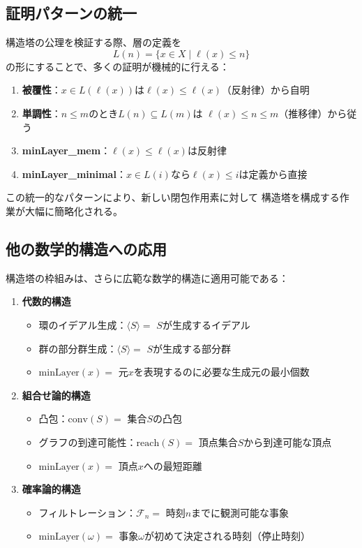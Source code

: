 \documentclass[a4paper,12pt]{ltjsarticle}
\theoremstyle{definition}
\begin{document}
\subsection{証明パターンの統一}

構造塔の公理を検証する際、層の定義を
\[
L(n) = \{x \in X \mid \ell(x) \leq n\}
\]
の形にすることで、多くの証明が機械的に行える：

\begin{enumerate}
\item \textbf{被覆性}：$x \in L(\ell(x))$は$\ell(x) \leq \ell(x)$（反射律）から自明
\item \textbf{単調性}：$n \leq m$のとき$L(n) \subseteq L(m)$は
  $\ell(x) \leq n \leq m$（推移律）から従う
\item \textbf{minLayer\_mem}：$\ell(x) \leq \ell(x)$は反射律
\item \textbf{minLayer\_minimal}：$x \in L(i)$なら$\ell(x) \leq i$は定義から直接
\end{enumerate}

この統一的なパターンにより、新しい閉包作用素に対して
構造塔を構成する作業が大幅に簡略化される。

\subsection{他の数学的構造への応用}

構造塔の枠組みは、さらに広範な数学的構造に適用可能である：

\begin{enumerate}
\item \textbf{代数的構造}
  \begin{itemize}
  \item 環のイデアル生成：$\langle S \rangle = $ $S$が生成するイデアル
  \item 群の部分群生成：$\langle S \rangle = $ $S$が生成する部分群
  \item $\mathrm{minLayer}(x) = $ 元$x$を表現するのに必要な生成元の最小個数
  \end{itemize}

\item \textbf{組合せ論的構造}
  \begin{itemize}
  \item 凸包：$\mathrm{conv}(S) = $ 集合$S$の凸包
  \item グラフの到達可能性：$\mathrm{reach}(S) = $ 頂点集合$S$から到達可能な頂点
  \item $\mathrm{minLayer}(x) = $ 頂点$x$への最短距離
  \end{itemize}

\item \textbf{確率論的構造}
  \begin{itemize}
  \item フィルトレーション：$\mathcal{F}_n = $ 時刻$n$までに観測可能な事象
  \item $\mathrm{minLayer}(\omega) = $ 事象$\omega$が初めて決定される時刻（停止時刻）
  \end{itemize}
\end{enumerate}
\end{document}

